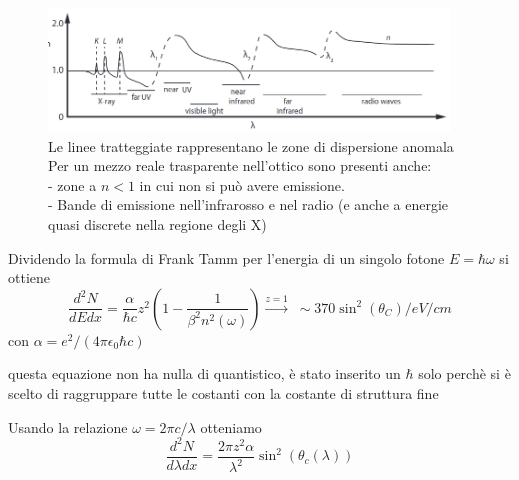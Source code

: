\begin{figure}[H]
    \centering
    \includegraphics[width=0.95\textwidth,frame]{Chapters/images/Particle_identification/image-20220317154755537.png}
    \captionsetup{width=0.95\textwidth}
    \caption{Le linee tratteggiate rappresentano le zone di dispersione anomala\\ Per un mezzo reale trasparente nell'ottico sono presenti anche:\\-  zone a $n<1$ in cui non si può avere emissione. \\- Bande di emissione nell'infrarosso e nel radio (e anche a energie quasi discrete nella regione degli X)}
    \label{fig:}
\end{figure}

Dividendo la formula di Frank Tamm per l'energia di un singolo fotone $E=\hbar \omega$ si ottiene
\[\frac{d^2N}{dEdx}= \frac{\alpha}{\hbar c}z^2\left( 1-\frac{1}{\beta^2n^2(\omega)} \right) \xrightarrow{z=1} \; \sim 370 \sin^2(\theta_C)/eV/cm\]
con $\alpha=e^2/(4\pi \epsilon_0 \hbar c)$
\begin{note} questa equazione non ha nulla di quantistico, è stato inserito un $\hbar$ solo perchè si è scelto di raggruppare tutte le costanti con la costante di struttura fine

\end{note}
Usando la relazione $\omega=2\pi c / \lambda$ otteniamo
\[
\frac{d^2N}{d\lambda dx}=\frac{2\pi z^2 \alpha}{\lambda^2}\sin^2(\theta_c(\lambda))\]

